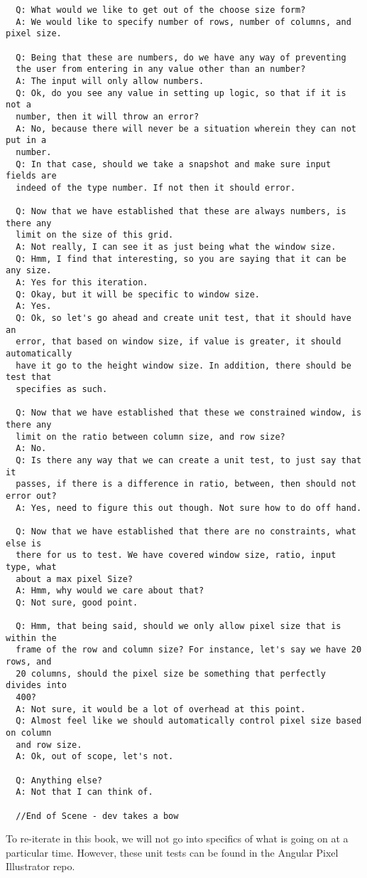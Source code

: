 \begin{lstlisting}
  Q: What would we like to get out of the choose size form?
  A: We would like to specify number of rows, number of columns, and pixel size.

  Q: Being that these are numbers, do we have any way of preventing
  the user from entering in any value other than an number?
  A: The input will only allow numbers.
  Q: Ok, do you see any value in setting up logic, so that if it is not a
  number, then it will throw an error?
  A: No, because there will never be a situation wherein they can not put in a
  number.
  Q: In that case, should we take a snapshot and make sure input fields are
  indeed of the type number. If not then it should error.

  Q: Now that we have established that these are always numbers, is there any
  limit on the size of this grid.
  A: Not really, I can see it as just being what the window size.
  Q: Hmm, I find that interesting, so you are saying that it can be any size.
  A: Yes for this iteration.
  Q: Okay, but it will be specific to window size.
  A: Yes.
  Q: Ok, so let's go ahead and create unit test, that it should have an
  error, that based on window size, if value is greater, it should automatically
  have it go to the height window size. In addition, there should be test that
  specifies as such.

  Q: Now that we have established that these we constrained window, is there any
  limit on the ratio between column size, and row size?
  A: No.
  Q: Is there any way that we can create a unit test, to just say that it
  passes, if there is a difference in ratio, between, then should not error out?
  A: Yes, need to figure this out though. Not sure how to do off hand.

  Q: Now that we have established that there are no constraints, what else is
  there for us to test. We have covered window size, ratio, input type, what
  about a max pixel Size?
  A: Hmm, why would we care about that?
  Q: Not sure, good point.

  Q: Hmm, that being said, should we only allow pixel size that is within the
  frame of the row and column size? For instance, let's say we have 20 rows, and
  20 columns, should the pixel size be something that perfectly divides into
  400?
  A: Not sure, it would be a lot of overhead at this point.
  Q: Almost feel like we should automatically control pixel size based on column
  and row size.
  A: Ok, out of scope, let's not.

  Q: Anything else?
  A: Not that I can think of.

  //End of Scene - dev takes a bow
\end{lstlisting}

To re-iterate in this book, we will not go into specifics of what is going on
at a particular time. However, these unit tests can be found in the Angular
Pixel Illustrator repo.
